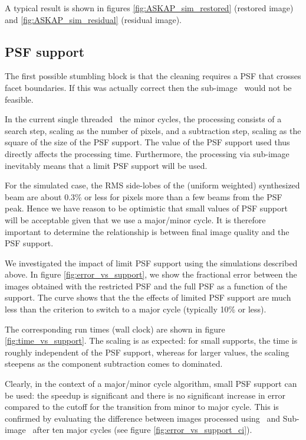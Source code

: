 \documentclass[11pt,a4paper,variablewidth]{article}
\begin{document}
A typical result is shown in figures \ref{fig:ASKAP_sim_restored} (restored image) and \ref{fig:ASKAP_sim_residual} (residual image).

\subsection{PSF support}

The first possible stumbling block is that the cleaning requires a PSF that crosses facet boundaries. If this was actually correct then the sub-image \MAM\ would not be feasible.

In the current single threaded \MAM\ the minor cycles, the processing consists of a search step, scaling as the number of pixels, and a subtraction step,  scaling as the square of the size of the PSF support. The value of the PSF support used thus directly affects the processing time. Furthermore, the processing via sub-image inevitably means that a limit PSF support will be used.

For the simulated case, the RMS side-lobes of the (uniform weighted) synthesized beam are about 0.3\% or less for pixels more than a few beams from the PSF peak. Hence we have reason to be optimistic that small values of PSF support will be acceptable given that we use a major/minor cycle. It is therefore important to determine the relationship is between final image quality and the PSF support. 

We investigated the impact of limit PSF support using the simulations described above. In figure \ref{fig:error_vs_support}, we show the fractional error between the images obtained with the restricted PSF and the full PSF as a function of the support. The curve shows that the the effects of limited PSF support are much less than the criterion to switch to a major cycle (typically 10\% or less).

The corresponding run times (wall clock) are shown in figure \ref{fig:time_vs_support}. The scaling is as expected: for small supports, the time is roughly independent of the PSF support, whereas for larger values, the scaling steepens as the component subtraction comes to dominated.

Clearly, in the context of a major/minor cycle algorithm, small PSF support can be used: the speedup is significant and there is no significant increase in error compared to the cutoff for the transition from minor to major cycle. This is confirmed by evaluating the difference between images processed using \MAM\ and Sub-image \MAM\ after ten major cycles (see figure \ref{fig:error_vs_support_ci}).
\end{document}
